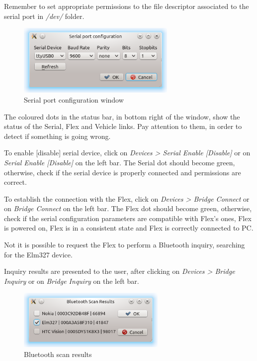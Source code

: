 \documentclass[twoside]{article}
\begin{document}
\begin{multicols}{2}
Remember to set appropriate permissions to the file descriptor associated to the serial port in \emph{/dev/} folder.

\begin{figure}[H]
  \centering
  \includegraphics[width=3in]{img/GUI/serial_port_configuration}
  \caption{Serial port configuration window}
\end{figure}


The coloured dots in the status bar, in bottom right of the window, show the status of the Serial, Flex and Vehicle links.
Pay attention to them, in order to detect if something is going wrong.

To enable [disable] serial device, click on \emph{Devices > Serial Enable [Disable]} or on \emph{Serial Enable [Disable]} on the left bar.
The Serial dot should become green, otherwise, check if the serial device is properly connected and permissions are correct.

To establish the connection with the Flex, click on \emph{Devices > Bridge Connect} or on \emph{Bridge Connect} on the left bar.
The Flex dot should become green, otherwise, check if the serial configuration parameters are compatible with Flex's ones, Flex is powered on, Flex is in a consistent state and Flex is correctly connected to PC.

Not it is possible to request the Flex to perform a Bluetooth inquiry, searching for the Elm327 device.

Inquiry results are presented to the user, after clicking on \emph{Devices > Bridge Inquiry} or on \emph{Bridge Inquiry} on the left bar.

\begin{figure}[H]
  \centering
  \includegraphics[width=2.8in]{img/GUI/bluetooth_scan_results}
  \caption{Bluetooth scan results}
\end{figure}


\end{multicols}
\end{document}
